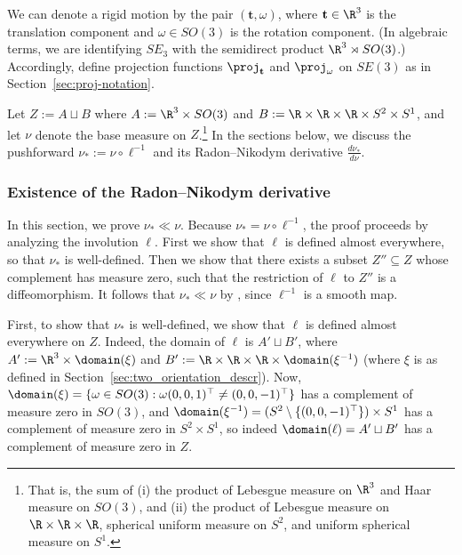 We can denote a rigid motion by the pair $(\mathbf{t}, \omega)$, where $\mathbf{t} \in \R^3$ is the translation component and $\omega \in SO(3)$ is the rotation component.
(In algebraic terms, we are identifying $SE_3$ with the semidirect product $\R^3 \rtimes SO(3)$.)
Accordingly, define projection functions $\proj_{\mathbf{t}}$ and $\proj_{\omega}$ on $SE(3)$ as in Section~\ref{sec:proj-notation}.

Let $Z := A \sqcup B$ where $A := \R^3 \times SO(3)$ and $B := \R \times \R \times \R \times S^2 \times S^1$, and let $\nu$ denote the base measure on $Z$.\footnote{
    That is, the sum of (i) the product of Lebesgue measure on $\R^3$ and Haar measure on $SO(3)$, and (ii) the product of Lebesgue measure on $\R \times \R \times \R$, spherical uniform measure on $S^2$, and uniform spherical measure on $S^1$.
}
In the sections below, we discuss the pushforward $\nu_* := \nu \circ \ell^{-1}$ and its Radon--Nikodym derivative $\frac{d\nu_*}{d\nu}$.

\subsubsection{Existence of the Radon--Nikodym derivative}\label{sec:RN_existence}

In this section, we prove $\nu_* \ll \nu$.  Because $\nu_* = \nu \circ \ell^{-1}$, the proof proceeds by analyzing the involution $\ell$.
First we show that $\ell$ is defined almost everywhere, so that $\nu_*$ is well-defined.
Then we show that there exists a subset $Z'' \subseteq Z$ whose complement has measure zero, such that the restriction of $\ell$ to $Z''$ is a diffeomorphism.
It follows that $\nu_* \ll \nu$ by \cite[Prop 6.5]{lee2003smooth}, since $\ell^{-1}$ is a smooth map.

First, to show that $\nu_*$ is well-defined, we show that $\ell$ is defined almost everywhere on $Z$.
Indeed, the domain of $\ell$ is $A' \sqcup B'$, where
   $A' := \R^3 \times \domain(\xi)$ and
   $B' := \R \times \R \times \R \times \domain(\xi^{-1})$
(where $\xi$ is as defined in Section~\ref{sec:two_orientation_descr}).
Now, $\domain(\xi) = \{\omega \in SO(3) : \omega (0, 0, 1)^\top \neq (0, 0, -1)^\top \}$ has a complement of measure zero in $SO(3)$, and $\domain(\xi^{-1}) = (S^2 \setminus \{(0, 0, -1)^\top\}) \times S^1$ has a complement of measure zero in $S^2 \times S^1$, so indeed $\domain(\ell) = A' \sqcup B'$ has a complement of measure zero in $Z$.

